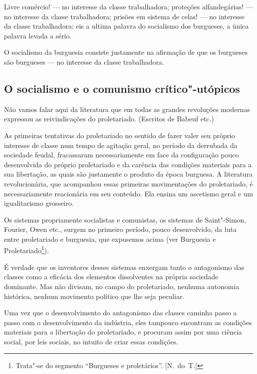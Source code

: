 Livre comércio!  ---  no interesse da classe trabalhadora; proteções
alfandegárias!  ---  no interesse da classe trabalhadora; prisões em
sistema de celas!  ---  no interesse da classe trabalhadora: eis a ultima
palavra do socialismo dos burgueses, a única palavra levada a sério.

O socialismo da burguesia consiste justamente na afirmação de que os
burgueses são burgueses  ---  no interesse da classe trabalhadora.

\subsection[O socialismo e o comunismo crítico"-utópicos]{O socialismo e o comunismo crítico"-utópicos}

Não vamos falar aqui da literatura que em todas as grandes revoluções
modernas expressou as reivindicações do proletariado. (Escritos de
Babeuf etc.)

As primeiras tentativas do proletariado no sentido de fazer valer seu
próprio interesse de classe num tempo de agitação geral, no período da
derrubada da sociedade feudal, fracassaram necessariamente em face da
configuração pouco desenvolvida do próprio proletariado e da carência
das condições materiais para a sua libertação, as quais são justamente
o produto da época burguesa. A literatura revolucionária, que
acompanhou essas primeiras movimentações do proletariado, é
necessariamente reacionária em seu conteúdo. Ela ensina um ascetismo
geral e um igualitarismo grosseiro.

Os sistemas propriamente socialistas e comunistas, os sistemas
de Saint"-Simon, Fourier, Owen etc., surgem no primeiro período, pouco
desenvolvido, da luta entre proletariado e burguesia, que expusemos
acima (ver Burguesia e
Proletariado\footnote{ Trata"-se do segmento  “Burgueses e
proletários”. [N.~do~T.]}).

É verdade que os inventores desses sistemas enxergam tanto o antagonismo
das classes como a eficácia dos elementos dissolventes na própria
sociedade dominante. Mas não divisam, no campo do proletariado, nenhuma
autonomia histórica, nenhum movimento político que lhe seja peculiar.

Uma vez que o desenvolvimento do antagonismo das classes caminha passo a
passo com o desenvolvimento da indústria, eles tampouco encontram as
condições materiais para a libertação do proletariado, e procuram assim
por uma ciência social, por leis sociais, no intuito de criar essas
condições.

